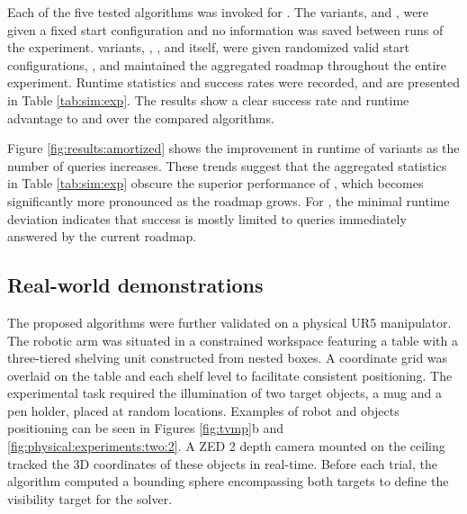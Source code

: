 Each of the five tested algorithms was invoked for . The \rrt variants, \rrt and \visrrt, were given a fixed start configuration and no information was saved between runs of the experiment. \prm variants, \visprm, \vir, and \prm itself, were given randomized valid start configurations, , and maintained the aggregated roadmap throughout the entire experiment. Runtime statistics and success rates were recorded, and are presented in Table \ref{tab:sim:exp}. The results show a clear success rate and runtime advantage to \visrrt and \visprm over the compared algorithms. 

Figure \ref{fig:results:amortized} shows the improvement in runtime of \prm variants as the number of queries increases. These trends suggest that the aggregated statistics in Table \ref{tab:sim:exp} obscure the superior performance of \visprm, which becomes significantly more pronounced as the roadmap grows.  For \prm, the minimal runtime deviation indicates that success is mostly limited to queries immediately answered by the current roadmap. %




\subsection{Real-world demonstrations}

The proposed \tvmp algorithms were further validated on a physical UR5 manipulator. The robotic arm was situated in a constrained workspace featuring a table with a three-tiered shelving unit constructed from nested boxes. A coordinate grid was overlaid on the table and each shelf level to facilitate consistent positioning. The experimental task required the illumination of two target objects, a mug and a pen holder, placed at random locations. Examples of robot and objects positioning can be seen in Figures \ref{fig:tvmp}b and \ref{fig:physical:experiments:two:2}. A ZED 2 depth camera mounted on the ceiling tracked the 3D coordinates of these objects in real-time. Before each trial, the algorithm computed a bounding sphere encompassing both targets to define the visibility target for the \tvmp solver. 

